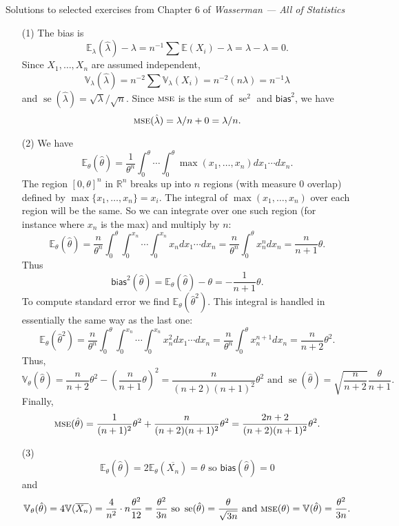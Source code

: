 \documentclass[10pt]{article}
\newcommand{\R}{\mathbb{R}}
\newcommand{\V}{\mathbb{V}}
\newcommand{\E}{\mathbb{E}}
\newcommand{\se}{\operatorname{se}}
\newcommand{\MSE}{\textsc{mse}}
\newcommand{\bias}{\mathsf{bias}}
\begin{document}
\noindent \large{Solutions to selected exercises from Chapter 6 of
\emph{Wasserman --- All of Statistics}}

\begin{enumerate}
\item[(1)]
The bias is
\[
\E_\lambda(\hat\lambda)-\lambda = n^{-1}\sum \E(X_i) -\lambda=
\lambda - \lambda=0.
\]
Since $X_1,\ldots,X_n$ are assumed independent,
\[
\V_\lambda(\hat\lambda)=n^{-2} \sum \V_\lambda(X_i) = n^{-2}(n\lambda)=
n^{-1}\lambda
\]
and $\se(\hat\lambda)=\sqrt{\lambda}/\sqrt{n}$.
Since $\MSE$ is the sum of $\se^2$ and $\bias^2$, we have
\[
\MSE(\hat\lambda)=\lambda/n + 0 = \lambda/n.
\]

\item[(2)]
We have
\[
\E_\theta(\hat\theta) = \frac{1}{\theta^n}\int_0^\theta \cdots \int_0^\theta
\max(x_1,\ldots,x_n)dx_1\cdots dx_n.
\]
The region $[0,\theta]^n$ in $\R^n$ breaks up into $n$ regions (with measure 0
overlap) defined by $\max\{x_1,\ldots,x_n\}=x_i$. The integral of
$\max(x_1,\ldots,x_n)$ over each region will be the same. So we can integrate
over one such region (for instance where $x_n$ is the max) and multiply by $n$:
\[
\E_\theta(\hat\theta) =
\frac{n}{\theta^n} \int_0^\theta \int_0^{x_n} \cdots \int_0^{x_n} x_n dx_1\cdots dx_n
= \frac{n}{\theta^n} \int_0^\theta x_n^n dx_n = \frac{n}{n+1}\theta.
\]
Thus
\[
\bias^2(\hat\theta)=\E_\theta(\hat\theta)-\theta=-\frac{1}{n+1}\theta.
\]
To compute standard error we find $\E_\theta(\hat\theta^2)$. This integral is
handled in essentially the same way as the last one:
\[
\E_\theta(\hat\theta^2)=
\frac{n}{\theta^n} \int_0^\theta\int_0^{x_n}\cdots\int_0^{x_n}x_n^2dx_1\cdots dx_n
= \frac{n}{\theta^n} \int_0^\theta x_n^{n+1}dx_n =\frac{n}{n+2}\theta^2.
\]
Thus,
\[
\V_\theta(\hat\theta) = \frac{n}{n+2} \theta^2 - \left(\frac{n}{n+1}\theta\right)^2
= \frac{n}{(n+2)(n+1)^2}\theta^2 \text{ and }
\se(\hat\theta) = \sqrt{\frac{n}{n+2}} \frac{\theta}{n+1}.
\]
Finally,
\[
\MSE(\hat\theta) = \frac{1}{(n+1)^2}\theta^2 +\frac{n}{(n+2)(n+1)^2}\theta^2
=\frac{2n+2}{(n+2)(n+1)^2}\theta^2.
\]

\item[(3)]
\[
\E_\theta(\hat\theta)=2\E_\theta(\overline{X_n})=\theta
\text{ so } \bias(\hat\theta) = 0
\]
and
\[
\V_\theta(\hat\theta) =
4\V(\overline{X_n})= \frac{4}{n^2} \cdot n\frac{\theta^2}{12} =
\frac{\theta^2}{3n} \text{ so } \se(\hat\theta) = \frac{\theta}{\sqrt{3n}}
\text{ and }
\MSE(\theta) = \V(\hat\theta)=\frac{\theta^2}{3n}.
\]
\end{enumerate}
\end{document}
